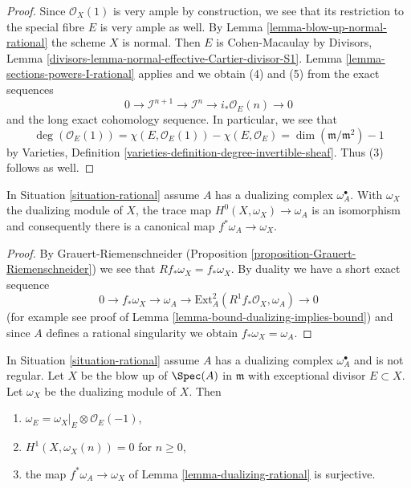 \begin{proof}
Since $\mathcal{O}_X(1)$ is very ample by construction, we see that
its restriction to the special fibre $E$ is very ample as well.
By Lemma \ref{lemma-blow-up-normal-rational} the scheme $X$ is normal.
Then $E$ is Cohen-Macaulay by
Divisors, Lemma \ref{divisors-lemma-normal-effective-Cartier-divisor-S1}.
Lemma \ref{lemma-sections-powers-I-rational} applies and we obtain
(4) and (5) from the exact sequences
$$
0 \to \mathcal{I}^{n + 1} \to \mathcal{I}^n \to i_*\mathcal{O}_E(n) \to 0
$$
and the long exact cohomology sequence. In particular, we see that
$$
\deg(\mathcal{O}_E(1)) = \chi(E, \mathcal{O}_E(1)) - \chi(E, \mathcal{O}_E) =
\dim(\mathfrak m/\mathfrak m^2) - 1
$$
by Varieties, Definition \ref{varieties-definition-degree-invertible-sheaf}.
Thus (3) follows as well.
\end{proof}

\begin{lemma}
\label{lemma-dualizing-rational}
In Situation \ref{situation-rational} assume $A$ has a
dualizing complex $\omega_A^\bullet$. With $\omega_X$ the dualizing
module of $X$, the trace map $H^0(X, \omega_X) \to \omega_A$ is an
isomorphism and consequently there is a canonical map
$f^*\omega_A \to \omega_X$.
\end{lemma}

\begin{proof}
By Grauert-Riemenschneider
(Proposition \ref{proposition-Grauert-Riemenschneider}) we see that
$Rf_*\omega_X = f_*\omega_X$. By duality we have a short exact
sequence
$$
0 \to f_*\omega_X \to \omega_A \to
\text{Ext}^2_A(R^1f_*\mathcal{O}_X, \omega_A) \to 0
$$
(for example see proof of Lemma \ref{lemma-bound-dualizing-implies-bound})
and since $A$ defines a rational singularity we obtain
$f_*\omega_X = \omega_A$.
\end{proof}

\begin{lemma}
\label{lemma-dualizing-blow-up-rational}
In Situation \ref{situation-rational} assume $A$ has a
dualizing complex $\omega_A^\bullet$ and is not regular.
Let $X$ be the blow up of $\Spec(A)$ in $\mathfrak m$ with
exceptional divisor $E \subset X$. Let $\omega_X$
be the dualizing module of $X$. Then
\begin{enumerate}
\item $\omega_E = \omega_X|_E \otimes \mathcal{O}_E(-1)$,
\item $H^1(X, \omega_X(n)) = 0$ for $n \geq 0$,
\item the map $f^*\omega_A \to \omega_X$ of
Lemma \ref{lemma-dualizing-rational} is surjective.
\end{enumerate}
\end{lemma}

